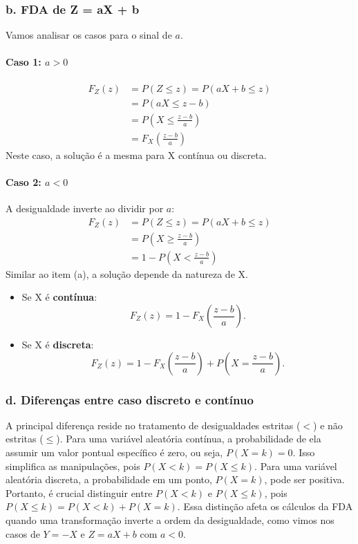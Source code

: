 \documentclass[12pt]{article}
\begin{document}
\subsubsection*{b. FDA de Z = aX + b}
Vamos analisar os casos para o sinal de $a$.

\paragraph{Caso 1: $a > 0$}
\begin{align*}
F_Z(z) &= P(Z \le z) = P(aX + b \le z) \\
&= P(aX \le z-b) \\
&= P\left(X \le \frac{z-b}{a}\right) \\
&= F_X\left(\frac{z-b}{a}\right)
\end{align*}
Neste caso, a solução é a mesma para X contínua ou discreta.

\paragraph{Caso 2: $a < 0$}
A desigualdade inverte ao dividir por $a$:
\begin{align*}
F_Z(z) &= P(Z \le z) = P(aX + b \le z) \\
&= P\left(X \ge \frac{z-b}{a}\right) \\
&= 1 - P\left(X < \frac{z-b}{a}\right)
\end{align*}
Similar ao item (a), a solução depende da natureza de X.
\begin{itemize}
    \item Se X é \textbf{contínua}:
    \[ F_Z(z) = 1 - F_X\left(\frac{z-b}{a}\right). \]
    \item Se X é \textbf{discreta}:
    \[ F_Z(z) = 1 - F_X\left(\frac{z-b}{a}\right) + P\left(X = \frac{z-b}{a}\right). \]
\end{itemize}

\subsubsection*{d. Diferenças entre caso discreto e contínuo}
A principal diferença reside no tratamento de desigualdades estritas ($<$) e não estritas ($\le$). Para uma variável aleatória contínua, a probabilidade de ela assumir um valor pontual específico é zero, ou seja, $P(X=k)=0$. Isso simplifica as manipulações, pois $P(X < k) = P(X \le k)$.
Para uma variável aleatória discreta, a probabilidade em um ponto, $P(X=k)$, pode ser positiva. Portanto, é crucial distinguir entre $P(X < k)$ e $P(X \le k)$, pois $P(X \le k) = P(X < k) + P(X=k)$. Essa distinção afeta os cálculos da FDA quando uma transformação inverte a ordem da desigualdade, como vimos nos casos de $Y=-X$ e $Z=aX+b$ com $a<0$.
\hfill \qedsymbol
\end{document}
